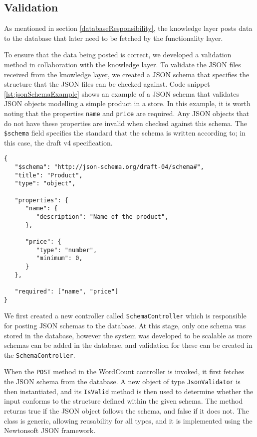 \newpage
\subsection{Validation}\label{sec:validation}

As mentioned in section \ref{databaseResponsibility}, the knowledge layer posts data to the database that later need to be fetched by the functionality layer.

To ensure that the data being posted is correct, we developed a validation method in collaboration with the knowledge layer.
To validate the JSON files received from the knowledge layer, we created a JSON schema that specifies the structure that the JSON files can be checked against. 
Code snippet \ref{lst:jsonSchemaExample} shows an example of a JSON schema that validates JSON objects modelling a simple product in a store. In this example, it is worth noting that the properties \texttt{name} and \texttt{price} are required. Any JSON objects that do not have these properties are invalid when checked against this schema. The \texttt{\$schema} field specifies the standard that the schema is written according to; in this case, the draft v4 specification\cite{tutorialspoint_jsonschema}.

\begin{lstlisting}[language=CSharp, caption={An example of a basic JSON schema.}, label={lst:jsonSchemaExample}]
{
   "$schema": "http://json-schema.org/draft-04/schema#",
   "title": "Product",
   "type": "object",
	
   "properties": {		
      "name": {
         "description": "Name of the product",
      },
		
      "price": {
         "type": "number",
         "minimum": 0,
      }
   },
	
   "required": ["name", "price"]
}
\end{lstlisting}

We first created a new controller called \texttt{SchemaController} which is responsible for posting JSON schemas to the database. 
At this stage, only one schema was stored in the database, however the system was developed to be scalable as more schemas can be added in the database, and validation for these can be created in the \texttt{SchemaController}.

When the \texttt{POST} method in the WordCount controller is invoked, it first fetches the JSON schema from the database.
A new object of type \texttt{JsonValidator} is then instantiated, and its \texttt{IsValid} method is then used to determine whether the input conforms to the structure defined within the given schema. 
The method returns true if the JSON object follows the schema, and false if it does not.
The class is generic, allowing reusability for all types, and it is implemented using the Newtonsoft JSON framework\cite{Json.NET}. 

